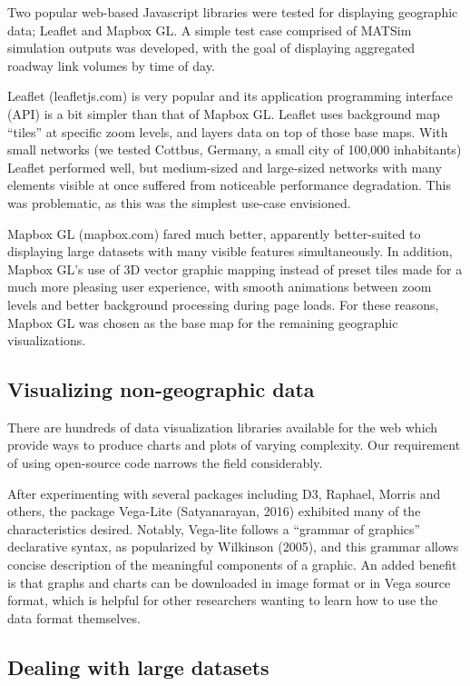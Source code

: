 Two popular web-based Javascript libraries were tested for displaying geographic data; Leaflet and Mapbox GL. A simple test case comprised of MATSim simulation outputs was developed, with the goal of displaying aggregated roadway link volumes by time of day.

Leaflet (leafletjs.com) is very popular and its application programming interface (API) is a bit simpler than that of Mapbox GL. Leaflet uses background map ``tiles'' at specific zoom levels, and layers data on top of those base maps. With small networks (we tested Cottbus, Germany, a small city of 100,000 inhabitants) Leaflet performed well, but medium-sized and large-sized networks with many elements visible at once suffered from noticeable performance degradation. This was problematic, as this was the simplest use-case envisioned.

Mapbox GL (mapbox.com) fared much better, apparently better-suited to displaying large datasets with many visible features simultaneously. In addition, Mapbox GL's use of 3D vector graphic mapping instead of preset tiles made for a much more pleasing user experience, with smooth animations between zoom levels and better background processing during page loads. For these reasons, Mapbox GL was chosen as the base map for the remaining geographic visualizations.

\hypertarget{visualizing-non-geographic-data}{%
\subsection{Visualizing non-geographic data}\label{visualizing-non-geographic-data}}

There are hundreds of data visualization libraries available for the web which provide ways to produce charts and plots of varying complexity. Our requirement of using open-source code narrows the field considerably.

After experimenting with several packages including D3, Raphael, Morris and others, the package Vega-Lite (Satyanarayan, 2016) exhibited many of the characteristics desired. Notably, Vega-lite follows a ``grammar of graphics'' declarative syntax, as popularized by Wilkinson (2005), and this grammar allows concise description of the meaningful components of a graphic. An added benefit is that graphs and charts can be downloaded in image format or in Vega source format, which is helpful for other researchers wanting to learn how to use the data format themselves.

\hypertarget{dealing-with-large-datasets}{%
\subsection{Dealing with large datasets}\label{dealing-with-large-datasets}}

